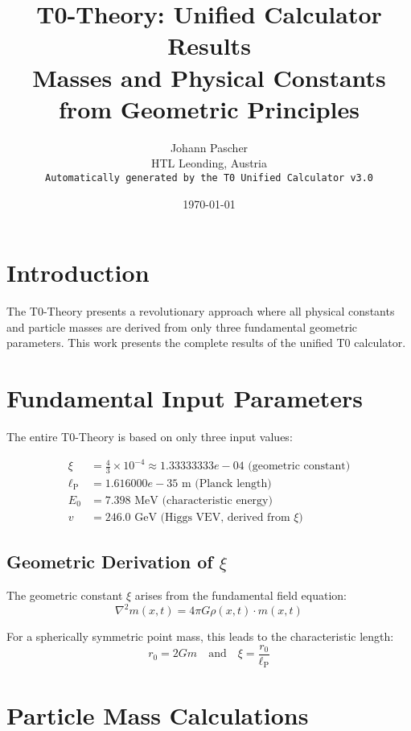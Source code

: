 \documentclass[11pt,a4paper]{article}
\title{T0-Theory: Unified Calculator Results\\
\large Masses and Physical Constants from Geometric Principles}
\author{Johann Pascher\\HTL Leonding, Austria\\
\texttt{Automatically generated by the T0 Unified Calculator v3.0}}
\date{\today}
\begin{document}
\maketitle

\tableofcontents
\newpage

\section{Introduction}

The T0-Theory presents a revolutionary approach where all physical constants and particle masses are derived from only three fundamental geometric parameters. This work presents the complete results of the unified T0 calculator.

\section{Fundamental Input Parameters}

The entire T0-Theory is based on only three input values:

\begin{align}
\xi &= \frac{4}{3} \times 10^{-4} \approx 1.33333333e-04 \text{ (geometric constant)} \\
\ell_\text{P} &= 1.616000e-35 \text{ m (Planck length)} \\
E_0 &= 7.398 \text{ MeV (characteristic energy)} \\
v &= 246.0 \text{ GeV (Higgs VEV, derived from } \xi \text{)}
\end{align}

\subsection{Geometric Derivation of $\xi$}

The geometric constant $\xi$ arises from the fundamental field equation:
\begin{equation}
\nabla^2 m(x,t) = 4\pi G \rho(x,t) \cdot m(x,t)
\end{equation}

For a spherically symmetric point mass, this leads to the characteristic length:
\begin{equation}
r_0 = 2Gm \quad \text{and} \quad \xi = \frac{r_0}{\ell_\text{P}}
\end{equation}

\section{Particle Mass Calculations}
\end{document}
